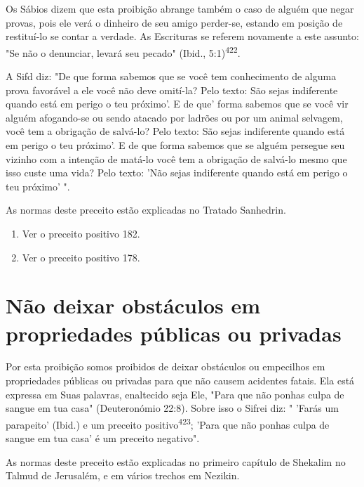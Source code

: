 \begin{itemize}
\begin{enumrate}
\begin{itemize}
\begin{itemize}
\begin{itemize}
Os Sábios dizem que esta proibição abrange também o caso de al­guém que
negar provas, pois ele verá o dinheiro de seu amigo perder-se, estan­do
em posição de restituí-lo se contar a verdade. As Escrituras se referem
nova­mente a este assunto: "Se não o denunciar, levará seu pecado"
(Ibid., 5:1)\textsuperscript{422}.

A Sifd diz: "De que forma sabemos que se você tem conhecimento de alguma
prova favorável a ele você não deve omití-la? Pelo texto: São sejas
indiferente quando está em perigo o teu próximo'. E de que' forma
sabemos que se você vir alguém afogando-se ou sendo atacado por ladrões
ou por um animal selvagem, você tem a obrigação de salvá-lo? Pelo texto:
São sejas indi­ferente quando está em perigo o teu próximo'. E de que
forma sabemos que se alguém persegue seu vizinho com a intenção de
matá-lo você tem a obriga­ção de salvá-lo mesmo que isso custe uma vida?
Pelo texto: 'Não sejas indife­rente quando está em perigo o teu próximo'
".


As normas deste preceito estão explicadas no Tratado Sanhedrin.

\begin{enumerate}
\def\labelenumi{\arabic{enumi}.}
\setcounter{enumi}{420}
\item
 
 Ver o preceito positivo 182.
 
\item
 
 Ver o preceito positivo 178.
 
\end{enumerate}



\section{Não deixar obstáculos em propriedades públicas ou privadas}

Por esta proibição somos proibidos de deixar obstáculos ou empe­cilhos
em propriedades públicas ou privadas para que não causem acidentes
fatais. Ela está expressa em Suas palavras, enaltecido seja Ele, "Para
que não ponhas culpa de sangue em tua casa" (Deuteronómio 22:8). Sobre
isso o Sifrei diz: " 'Farás um parapeito' (Ibid.) e um preceito
positivo\textsuperscript{423}; 'Para que não po­nhas culpa de sangue em
tua casa' é um preceito negativo".

As normas deste preceito estão explicadas no primeiro capítulo de
Shekalim no Talmud de Jerusalém, e em vários trechos em Nezikin.


\end{itemize}
\end{itemize}
\end{itemize}
\end{enumrate}
\end{itemize}
